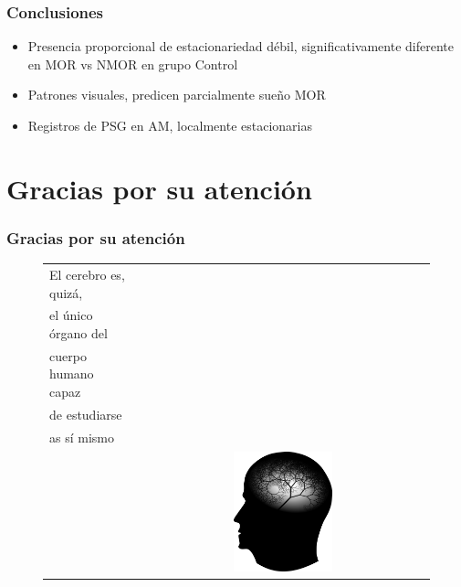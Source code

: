 \documentclass[serif,mathserif,professionalfont]{beamer}
\begin{document}
\begin{frame}\frametitle{Conclusiones}
\begin{itemize}
\item Presencia proporcional de estacionariedad d\'ebil, significativamente diferente en MOR vs 
NMOR en grupo Control



\item Patrones visuales, predicen parcialmente sue\~no MOR

\item Registros de PSG en AM, localmente estacionarias
\end{itemize}
\end{frame}


\section*{Gracias por su atención}

\begin{frame}\frametitle{Gracias por su atención}
\begin{figure}%
\centering
\begin{tabular}{lc}
El cerebro es, quizá,\\
el único órgano del\\
cuerpo humano capaz \\
de estudiarse \\
as sí mismo\\
&
\includegraphics[width = 0.35\textwidth]{frase.png} 
\end{tabular}
\end{figure}
\end{frame}

\end{document}
